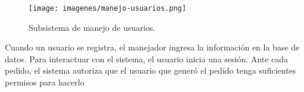 \begin{figure}[H]
  \centering
  \texttt{[image: imagenes/manejo-usuarios.png]}
  \caption{Subsistema de manejo de usuarios.}
\end{figure}

Cuando un usuario se registra, el manejador
ingresa la información en la base de datos.
Para interactuar con el sistema, el usuario
inicia una sesión.
Ante cada pedido, el sistema autoriza que el
usuario que generó el pedido tenga suficientes
permisos para hacerlo
